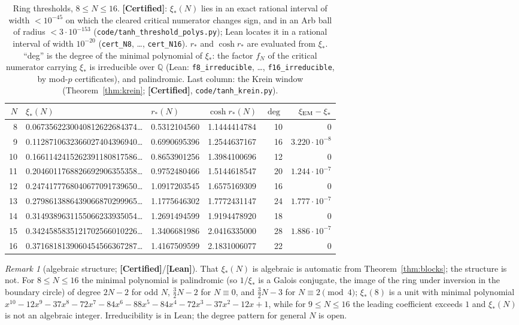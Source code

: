 \documentclass[11pt]{article}
\theoremstyle{definition}
\theoremstyle{remark}
\newtheorem{remark}[theorem]{Remark}
\newcommand{\st}[1]{\textbf{[#1]}}
\newcommand{\lean}[1]{\nolinkurl{#1}}
\begin{document}
\begin{table}[t]\centering\small
\begin{tabular}{rlllrr}\toprule
$N$ & $\xi_*(N)$ & $r_*(N)$ & $\cosh r_*(N)$ & $\deg$ & $\xi_{\rm EM}-\xi_*$\\\midrule
8 & 0.0673562230040812622684374\ldots & 0.5312104560 & 1.1444414784 & 10 & 0\\
9 & 0.1128710632366027404396940\ldots & 0.6990695396 & 1.2544637167 & 16 & $3.220\cdot10^{-8}$\\
10 & 0.1661142415262391180817586\ldots & 0.8653901256 & 1.3984100696 & 12 & 0\\
11 & 0.2046011768826692906355358\ldots & 0.9752480466 & 1.5144618547 & 20 & $1.244\cdot10^{-7}$\\
12 & 0.2474177768040677091739650\ldots & 1.0917203545 & 1.6575169309 & 16 & 0\\
13 & 0.2798613886439066870299965\ldots & 1.1775646302 & 1.7772431147 & 24 & $1.777\cdot10^{-7}$\\
14 & 0.3149389631155066233935054\ldots & 1.2691494599 & 1.9194478920 & 18 & 0\\
15 & 0.3424585835121702566010226\ldots & 1.3406681986 & 2.0416335000 & 28 & $1.886\cdot10^{-7}$\\
16 & 0.3716818139060454566367287\ldots & 1.4167509599 & 2.1831006077 & 22 & 0\\\bottomrule
\end{tabular}
\caption{Ring thresholds, $8\le N\le16$. \st{Certified}: $\xi_*(N)$ lies in an exact rational interval of width $<10^{-45}$
on which the cleared critical numerator changes sign, and in an Arb ball of radius $<3\cdot10^{-153}$
(\nolinkurl{code/tanh_threshold_polys.py}); Lean locates it in a rational interval of width $10^{-20}$ (\lean{cert_N8},
\dots, \lean{cert_N16}). $r_*$ and $\cosh r_*$ are evaluated from $\xi_*$. ``deg'' is the degree of the minimal polynomial
of $\xi_*$: the factor $f_N$ of the critical numerator carrying $\xi_*$ is irreducible over $\mathbb Q$ (Lean:
\lean{f8_irreducible}, \dots, \lean{f16_irreducible}, by mod-$p$ certificates), and palindromic. Last column: the Krein
window (Theorem~\ref{thm:krein}; \st{Certified}, \nolinkurl{code/tanh_krein.py}).}\label{tab:thr}
\end{table}

\begin{remark}[algebraic structure; \st{Certified}/\st{Lean}]\label{rem:alg}
That $\xi_*(N)$ is algebraic is automatic from Theorem~\ref{thm:blocks}; the structure is not. For $8\le N\le16$ the minimal
polynomial is palindromic (so $1/\xi_*$ is a Galois conjugate, the image of the ring under inversion in the boundary circle) of
degree $2N-2$ for odd $N$, $\frac32N-2$ for $N\equiv0$, and $\frac32N-3$ for $N\equiv2\pmod4$; $\xi_*(8)$ is a unit with minimal
polynomial $x^{10}-12x^9-37x^8-72x^7-84x^6-88x^5-84x^4-72x^3-37x^2-12x+1$, while for $9\le N\le16$ the leading coefficient
exceeds $1$ and $\xi_*(N)$ is not an algebraic integer. Irreducibility is in Lean; the degree pattern for general $N$ is open.
\end{remark}
\end{document}
